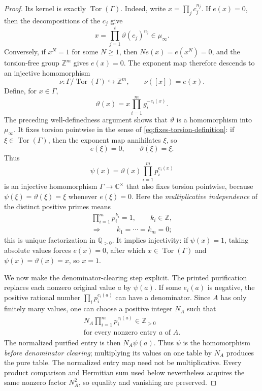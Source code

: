 \documentclass[11pt]{article}
\theoremstyle{plain}
\theoremstyle{definition}
\theoremstyle{remark}
\DeclareMathOperator{\Tor}{Tor}
\begin{document}
\begin{proof}
Its kernel is exactly $\Tor(\Gamma)$.  Indeed, write
$x=\prod_j c_j^{n_j}$.  If $e(x)=0$, then the decompositions of the $c_j$
give
\[
  x=\prod_{j=1}^t\vartheta(c_j)^{n_j}\in\mu_\infty.
\]
Conversely, if
$x^N=1$ for some $N\ge1$, then $N e(x)=e(x^N)=0$, and the torsion-free group
$\mathbb Z^m$ gives $e(x)=0$.  The exponent map therefore descends to an
injective homomorphism
\[
  \nu:\Gamma/\Tor(\Gamma)\hookrightarrow\mathbb Z^m,
  \qquad \nu([x])=e(x).
\]
Define, for $x\in\Gamma$,
\[
  \vartheta(x)=x\prod_{i=1}^m g_i^{-e_i(x)}.
\]
The preceding well-definedness argument shows that $\vartheta$ is a
homomorphism into $\mu_\infty$.  It fixes torsion pointwise in the sense of
\eqref{eq:fixes-torsion-definition}: if $\xi\in\Tor(\Gamma)$, then the
exponent map annihilates $\xi$, so
\[
  e(\xi)=0,
  \qquad
  \vartheta(\xi)=\xi.
\]
Thus
\[
  \psi(x)=\vartheta(x)\prod_{i=1}^m p_i^{e_i(x)}
\]
is an injective homomorphism $\Gamma\to\mathbb C^\times$ that also fixes
torsion pointwise, because $\psi(\xi)=\vartheta(\xi)=\xi$ whenever
$e(\xi)=0$.  Here the \emph{multiplicative independence} of the distinct
positive primes means
\[
  \begin{gathered}
    \prod_{i=1}^m p_i^{k_i}=1,
    \qquad k_i\in\mathbb Z,\\
    \Longrightarrow\qquad k_1=\cdots=k_m=0;
  \end{gathered}
\]
this is unique factorization in $\mathbb Q_{>0}$.  It implies injectivity:
if $\psi(x)=1$, taking absolute values forces $e(x)=0$, after which
$x\in\Tor(\Gamma)$ and $\psi(x)=\vartheta(x)=x$, so $x=1$.

We now make the denominator-clearing step explicit.  The printed
purification replaces each nonzero original value $a$ by $\psi(a)$.  If some
$e_i(a)$ is negative, the positive rational number
$\prod_i p_i^{e_i(a)}$ can have a denominator.  Since $A$ has only finitely
many values, one can choose a positive integer $N_A$ such that
\[
  \begin{gathered}
    N_A\prod_{i=1}^m p_i^{e_i(a)}\in\mathbb Z_{>0}\\
    \text{for every nonzero entry }a\text{ of }A.
  \end{gathered}
\]
The normalized purified entry is then $N_A\psi(a)$.  Thus $\psi$ is the
homomorphism \emph{before denominator clearing}; multiplying its values on
one table by $N_A$ produces the pure table.  The normalized entry map need
not be multiplicative.  Every product comparison and Hermitian sum used
below nevertheless acquires the same nonzero factor $N_A^2$, so equality and
vanishing are preserved.


\end{proof}
\end{document}
